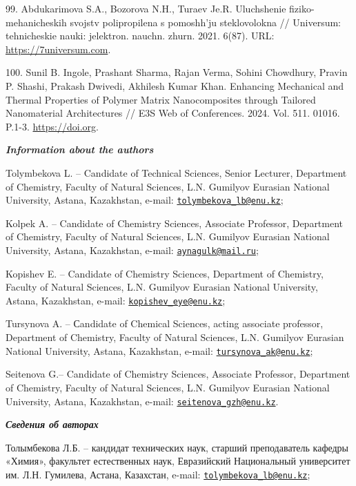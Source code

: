 \begin{references}
99. Abdukarimova S.A., Bozorova N.H., Turaev Je.R. Uluchshenie
fiziko-mehanicheskih svojstv poliprop\-ilena s pomoshh'ju steklovolokna
// Universum: tehnicheskie nauki:
jelektron. nauchn. zhurn. 2021. 6(87). URL: \href{https://7universum.com/ru/tech/archive/item/11948}{https://7universum.com}.

100. Sunil B. Ingole, Prashant Sharma, Rajan Verma, Sohini Chowdhury,
Pravin P. Shashi, Prakash Dwivedi, Akhilesh Kumar Khan. Enhancing
Mechanical and Thermal Properties of Polymer Matrix Nanocomposites
through Tailored Nanomaterial Architectures // E3S Web of
Conferences. 2024. Vol. 511. 01016. P.1-3. \href{https://doi.org/10.1051/e3sconf/202451101016}{https://doi.org}.
\end{references}

\begin{authorinfo}
\emph{{\bfseries Information about the authors}}

Tolymbekova L. -- Candidate of Technical Sciences, Senior Lecturer,
Department of Chemistry, Faculty of Natural Sciences, L.N. Gumilyov
Eurasian National University, Astana, Kazakhstan, e-mail:
\href{mailto:tolymbekova\_lb@enu.kz}{\nolinkurl{tolymbekova\_lb@enu.kz}};

Kolpek A. -- Candidate of Chemistry Sciences, Associate Professor,
Department of Chemistry, Faculty of Natural Sciences, L.N. Gumilyov
Eurasian National University, Astana, Kazakhstan, e-mail:
\href{mailto:aynagulk@mail.ru}{\nolinkurl{aynagulk@mail.ru}};

Kopishev E. -- Candidate of Chemistry Sciences, Department of Chemistry,
Faculty of Natural Sciences, L.N. Gumilyov Eurasian National University,
Astana, Kazakhstan, e-mail:
\href{mailto:kopishev\_eye@enu.kz}{\nolinkurl{kopishev\_eye@enu.kz}};

Tursynova A. -- Сandidate of Chemical Sciences, acting associate
professor, Department of Chemistry, Faculty of Natural Sciences, L.N.
Gumilyov Eurasian National University, Astana, Kazakhstan, e-mail:
\href{mailto:tursynova\_ak@enu.kz}{\nolinkurl{tursynova\_ak@enu.kz}};

Seitenova G.-- Candidate of Chemistry Sciences, Associate Professor,
Department of Chemistry, Faculty of Natural Sciences, L.N. Gumilyov
Eurasian National University, Astana, Kazakhstan, e-mail:
\href{mailto:seitenova\_gzh@enu.kz}{\nolinkurl{seitenova\_gzh@enu.kz}}.

\emph{{\bfseries Сведения об авторах}}

Толымбекова Л.Б. -- кандидат технических наук, старший преподаватель
кафедры «Химия», факультет естественных наук, Евразийский Национальный
университет им. Л.Н. Гумилева, Астана, Казахстан, e-mail:
\href{mailto:tolymbekova\_lb@enu.kz}{\nolinkurl{tolymbekova\_lb@enu.kz}};


\end{authorinfo}
